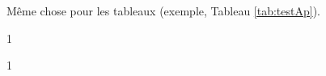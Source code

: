 \documentclass[letterpaper%
, twoside%
, 12pt%
,these%
,french
,creativecommons,hyperref,withAlgo2e%
]{thETS}
\begin{document}
Même chose pour les tableaux (exemple, Tableau \ref{tab:testAp}).



\cleardoublepage
\begin{spacing}{1}
    \setlength{\bibsep}{\baselineskip}
    \setlength{\bibhang}{3em}
	\nocite{*} %


\end{spacing}


\cleardoublepage
\begin{spacing}{1}
    \setlength{\bibsep}{\baselineskip}
    \setlength{\bibhang}{3em}


\end{spacing}
\end{document}
